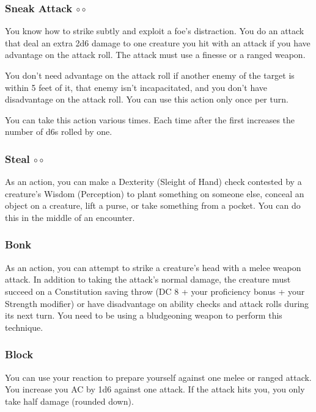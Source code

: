 \subsubsection{Sneak Attack $\circ\circ$} \label{act::sneakattack}
    You know how to strike subtly and exploit a foe's distraction.
    You do an attack that deal an extra 2d6 damage to one creature you hit with an attack if you have advantage on the attack roll.
    The attack must use a finesse or a ranged weapon.

    You don't need advantage on the attack roll if another enemy of the target is within 5 feet of it, that enemy isn't incapacitated, and you don't have disadvantage on the attack roll.
    You can use this action only once per turn.

    You can take this action various times.
    Each time after the first increases the number of d6s rolled by one.

\subsubsection{Steal $\circ\circ$} \label{act::steal}
    As an action, you can make a Dexterity (Sleight of Hand) check contested by a creature's Wisdom (Perception) to plant something on someone else, conceal an object on a creature, lift a purse, or take something from a pocket.
    You can do this in the middle of an encounter.

\subsubsection{Bonk} \label{tec::bonk}
As an action, you can attempt to strike a creature's head with a melee weapon attack.
In addition to taking the attack's normal damage, the creature must succeed on a Constitution saving throw (DC 8 + your proficiency bonus + your Strength modifier) or have disadvantage on ability checks and attack rolls during its next turn.
You need to be using a bludgeoning weapon to perform this technique.

\subsubsection{Block} \label{tec::block}
You can use your reaction to prepare yourself against one melee or ranged attack.
You increase you AC by 1d6 against one attack.
If the attack hits you, you only take half damage (rounded down).

